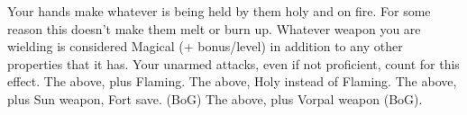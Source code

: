 {Your hands make whatever is being held by them holy and on fire. For some reason this doesn't make them melt or burn up.}
{Whatever weapon you are wielding is considered Magical (+ bonus/level) in addition to any other properties that it has. Your unarmed attacks, even if not proficient, count for this effect.}
{The above, plus Flaming.}
{The above, Holy instead of Flaming.}
{The above, plus Sun weapon, Fort save. (BoG)}
{The above, plus Vorpal weapon (BoG).}